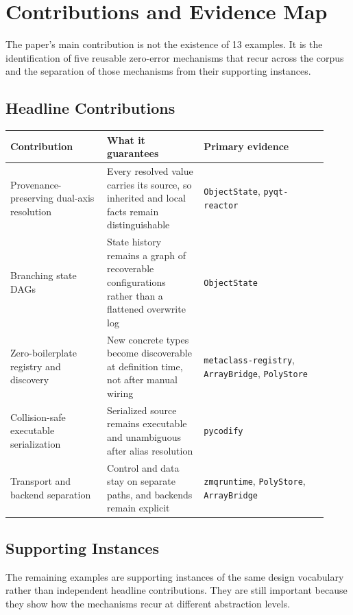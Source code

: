\section{Contributions and Evidence Map}

The paper's main contribution is not the existence of 13 examples. It is the identification of five reusable zero-error mechanisms that recur across the corpus and the separation of those mechanisms from their supporting instances.

\subsection{Headline Contributions}

\begin{center}
\begin{tabular}{@{}p{0.28\linewidth}p{0.28\linewidth}p{0.36\linewidth}@{}}
\toprule
\textbf{Contribution} & \textbf{What it guarantees} & \textbf{Primary evidence} \\
\midrule
Provenance-preserving dual-axis resolution & Every resolved value carries its source, so inherited and local facts remain distinguishable & \texttt{ObjectState}, \texttt{pyqt-reactor} \\
Branching state DAGs & State history remains a graph of recoverable configurations rather than a flattened overwrite log & \texttt{ObjectState} \\
Zero-boilerplate registry and discovery & New concrete types become discoverable at definition time, not after manual wiring & \texttt{metaclass-registry}, \texttt{ArrayBridge}, \texttt{PolyStore} \\
Collision-safe executable serialization & Serialized source remains executable and unambiguous after alias resolution & \texttt{pycodify} \\
Transport and backend separation & Control and data stay on separate paths, and backends remain explicit & \texttt{zmqruntime}, \texttt{PolyStore}, \texttt{ArrayBridge} \\
\bottomrule
\end{tabular}
\end{center}

\subsection{Supporting Instances}

The remaining examples are supporting instances of the same design vocabulary rather than independent headline contributions. They are still important because they show how the mechanisms recur at different abstraction levels.


